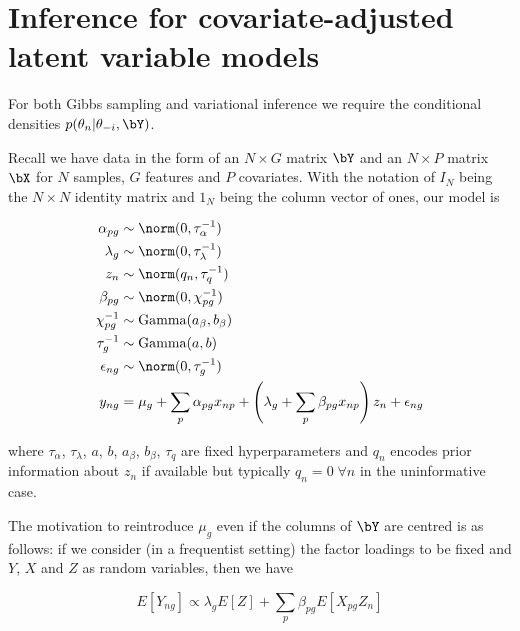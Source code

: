 
\chapter{Inference for covariate-adjusted latent variable models} \label{app:clvm}


For both Gibbs sampling and variational inference we require the conditional densities $p(\theta_n | \theta_{-i}, \bY)$.

Recall we have data in the form of an $N \times G$ matrix $\bY$ and an $N \times P$ matrix $\bX$ for $N$ samples, $G$ features and $P$ covariates. With the notation of $I_N$ being the $N \times N$ identity matrix and $1_N$ being the column vector of ones, our model is

\begin{equation}
\begin{aligned}
\alpha_{pg} & \sim \norm(0, \tau_\alpha^{-1}) \\
\lambda_g & \sim \norm(0, \tau_\lambda^{-1}) \\
z_n & \sim \norm(q_n, \tau_q^{-1}) \\
\beta_{pg} & \sim \norm(0, \chi_{pg}^{-1}) \\
\chi_{pg}^{-1} & \sim \text{Gamma}(a_\beta, b_\beta) \\
\tau_{g}^{-1} & \sim \text{Gamma}(a, b) \\
\epsilon_{ng} & \sim \norm(0, \tau_g^{-1}) \\
y_{ng} & =  \mu_g + \sum_p \alpha_{pg} x_{np} + \left( \lambda_g + \sum_p \beta_{pg} x_{np} \right) z_n + \epsilon_{ng}
\end{aligned} \label{eq:clvm_model}
\end{equation}

where $\tau_\alpha$, $\tau_\lambda$, $a$, $b$, $a_\beta$, $b_\beta$, $\tau_q$ are fixed hyperparameters and $q_n$ encodes prior information about $z_n$ if available but typically $q_n = 0 \; \forall n$ in the uninformative case.



The motivation to reintroduce $\mu_g$ even if the columns of $\bY$ are centred is as follows: if we consider (in a frequentist setting) the factor loadings to be fixed and $Y$, $X$ and $Z$ as random variables, then we have

\begin{equation}
E[Y_{ng}] \propto \lambda_g E[Z] + \sum_p \beta_{pg} E[X_{pg}Z_n]
\end{equation}

